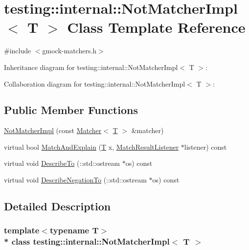 \hypertarget{classtesting_1_1internal_1_1_not_matcher_impl}{}\section{testing\+:\+:internal\+:\+:Not\+Matcher\+Impl$<$ T $>$ Class Template Reference}
\label{classtesting_1_1internal_1_1_not_matcher_impl}


{\ttfamily \#include $<$gmock-\/matchers.\+h$>$}



Inheritance diagram for testing\+:\+:internal\+:\+:Not\+Matcher\+Impl$<$ T $>$\+:


Collaboration diagram for testing\+:\+:internal\+:\+:Not\+Matcher\+Impl$<$ T $>$\+:
\subsection*{Public Member Functions}
\begin{DoxyCompactItemize}
\item 
\hyperlink{classtesting_1_1internal_1_1_not_matcher_impl_aaf35f72ebe8379f09169f4f0845cc663}{Not\+Matcher\+Impl} (const \hyperlink{classtesting_1_1_matcher}{Matcher}$<$ \hyperlink{functions__7_8js_adf1f3edb9115acb0a1e04209b7a9937b}{T} $>$ \&matcher)
\item 
virtual bool \hyperlink{classtesting_1_1internal_1_1_not_matcher_impl_a7bba5c61d441787acba61a069f5d5ac2}{Match\+And\+Explain} (\hyperlink{functions__7_8js_adf1f3edb9115acb0a1e04209b7a9937b}{T} x, \hyperlink{classtesting_1_1_match_result_listener}{Match\+Result\+Listener} $\ast$listener) const 
\item 
virtual void \hyperlink{classtesting_1_1internal_1_1_not_matcher_impl_a9bb6e1bdb6ef18ac9de5a4dd56baa63d}{Describe\+To} (\+::std\+::ostream $\ast$os) const 
\item 
virtual void \hyperlink{classtesting_1_1internal_1_1_not_matcher_impl_ad0b7d4123d3106824c83b916fc577f78}{Describe\+Negation\+To} (\+::std\+::ostream $\ast$os) const 
\end{DoxyCompactItemize}


\subsection{Detailed Description}
\subsubsection*{template$<$typename T$>$\\*
class testing\+::internal\+::\+Not\+Matcher\+Impl$<$ T $>$}



